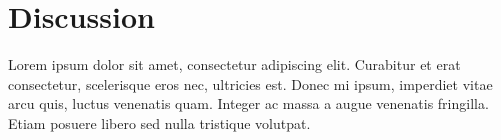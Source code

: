 \section{Discussion}
Lorem ipsum dolor sit amet, consectetur adipiscing elit. Curabitur et erat consectetur, 
scelerisque eros nec, ultricies est. Donec mi ipsum, imperdiet vitae arcu quis, luctus venenatis quam. 
Integer ac massa a augue venenatis fringilla. Etiam posuere libero sed nulla tristique volutpat.